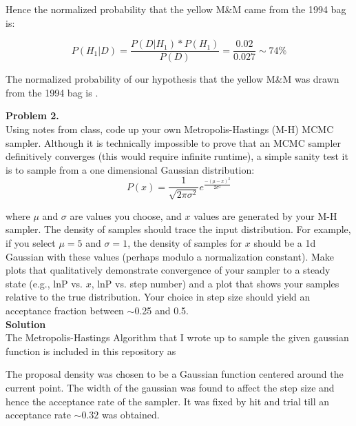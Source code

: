 \documentclass[12pt,usletter,english]{article}
\begin{document}
\noindent Hence the normalized probability that the yellow M\&M came
from the 1994 bag is:

\begin{equation}
  P(H_1|D) = \frac{P(D|H_1)*P(H_1)}{P(D)} = \frac{0.02}{0.027} \sim
  74\%
\end{equation}

The normalized probability of our hypothesis that the yellow M\&M was
drawn from the 1994 bag is .

\newpage

\noindent \textbf{Problem 2.} \\ 

Using notes from class, code up your own Metropolis-Hastings (M-H)
MCMC sampler.  Although it is technically impossible to prove that an
MCMC sampler definitively converges (this would require infinite
runtime), a simple sanity test it is to sample from a one dimensional
Gaussian distribution:
\begin{equation}
P(x)= \frac{1}{\sqrt{2\pi\sigma^2}} e^\frac{-(\mu-x)^2}{2\sigma^2}
\end{equation}

\noindent where $\mu$ and $\sigma$ are values you choose, and $x$
values are generated by your M-H sampler.  The density of samples
should trace the input distribution.  For example, if you select
$\mu=5$ and $\sigma=1$, the density of samples for $x$ should be a 1d
Gaussian with these values (perhaps modulo a normalization
constant). Make plots that qualitatively demonstrate convergence of
your sampler to a steady state (e.g., lnP vs. $x$, lnP vs. step
number) and a plot that shows your samples relative to the true
distribution. Your choice in step size should yield an acceptance
fraction between $\sim$0.25 and 0.5. \\

\noindent \textbf{Solution}\\

The Metropolis-Hastings Algorithm that I wrote up to sample the given
gaussian function is included in this repository as

The proposal density was chosen to be a Gaussian function centered
around the current point. The width of the gaussian was found to
affect the step size and hence the acceptance rate of the sampler. It
was fixed by hit and trial till an acceptance rate $\sim 0.32$ was
obtained.
\end{document}
